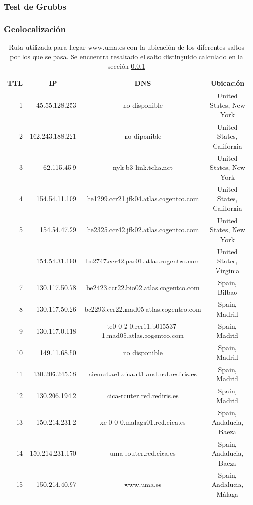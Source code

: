 \subsubsection{Test de Grubbs}\label{malaga:grubbs}

\subsubsection{Geolocalización}

\begin{table}[H]
    \begin{center}
        \begin{tabular}{| r | r | c | c |}
  \hline
  {\bf TTL} & \multicolumn{1}{|c|}{\bf IP} & {\bf DNS} & {\bf Ubicación}\\
  \hline
\hline 1 & 45.55.128.253 & no disponible & United States, New York\\
\hline 2 & 162.243.188.221 & no diponible & United States, California\\
\hline 3 & 62.115.45.9 & nyk-b3-link.telia.net & United States, New York\\
\hline 4 & 154.54.11.109 & be1299.ccr21.jfk04.atlas.cogentco.com & United States, California\\
\hline 5 & 154.54.47.29 & be2325.ccr42.jfk02.atlas.cogentco.com & United States, New York\\
\rowcolor{blue!25}\hline 6 & 154.54.31.190 & be2747.ccr42.par01.atlas.cogentco.com & United States, Virginia\\
\hline 7 & 130.117.50.78 & be2423.ccr22.bio02.atlas.cogentco.com & Spain, Bilbao\\
\hline 8 & 130.117.50.26 & be2293.ccr22.mad05.atlas.cogentco.com & Spain, Madrid\\
\hline 9 & 130.117.0.118 & te0-0-2-0.rcr11.b015537-1.mad05.atlas.cogentco.com & Spain, Madrid\\
\hline 10 & 149.11.68.50 & no disponible & Spain, Madrid\\
\hline 11 & 130.206.245.38 & ciemat.ae1.cica.rt1.and.red.rediris.es & Spain, Madrid\\
\hline 12 & 130.206.194.2 & cica-router.red.rediris.es & Spain, Madrid\\
\hline 13 & 150.214.231.2 & xe-0-0-0.malaga01.red.cica.es & Spain, Andalucia, Baeza\\
\hline 14 & 150.214.231.170 & uma-router.red.cica.es & Spain, Andalucia, Baeza\\
\hline 15 & 150.214.40.97 & www.uma.es & Spain, Andalucia, M\'alaga\\
\hline
        \end{tabular}
        \caption{Ruta utilizada para llegar www.uma.es con la ubicación de los diferentes saltos por los que se pasa. Se encuentra resaltado el salto distinguido calculado en la sección \ref{malaga:grubbs}}
        \label{table:malaga} 
    \end{center}
\end{table}

